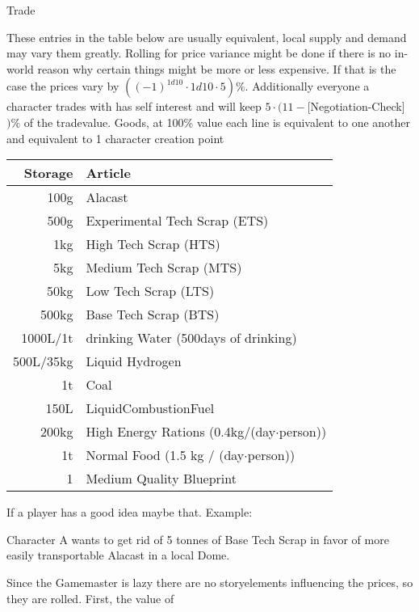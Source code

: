 \documentclass{article}
\newcommand{\subhline}[1]{\begin{center}\large #1 \normalsize \end{center}}
\begin{document}
    \pagebreak
    \subhline{Trade}

    These entries in the table below are usually equivalent, local supply and demand may vary them greatly.
    Rolling for price variance might be done if there is no in-world reason why certain things might be more or
    less expensive. If that is the case the prices vary by \(((-1)^{1d10}\cdot1d10\cdot5) \%\).
    Additionally everyone a character trades with has self interest and will keep \(5\cdot(11-\)[Negotiation-Check]\()\%\) of
    the tradevalue.\newline \newline
    Goods, at 100\% value each line is equivalent to one another and equivalent to 1 character creation point \par
    \begin{tabular}{r|l}
        Storage & Article\\\hline
        100g & Alacast\\\hline
        500g & Experimental Tech Scrap (ETS)\\\hline
        1kg & High Tech Scrap (HTS)\\\hline
        5kg & Medium Tech Scrap (MTS)\\\hline
        50kg & Low Tech Scrap (LTS)\\\hline
        500kg & Base Tech Scrap (BTS)\\\hline
        1000L/1t & drinking Water (500days of drinking)\\\hline
        500L/35kg & Liquid Hydrogen\\\hline
        1t & Coal\\\hline
        150L & LiquidCombustionFuel\\\hline
        200kg & High Energy Rations (0.4kg/(day\(\cdot\)person))\\\hline
        1t & Normal Food (1.5 kg / (day\(\cdot\)person))\\\hline
        1 & Medium Quality Blueprint\\\hline

    \end{tabular}\par
    If a player has a good idea maybe that.\newline
    \newline
    Example:\par
    Character A wants to get rid of 5 tonnes of Base Tech Scrap in favor of more easily transportable Alacast in a local
    Dome.\par
    Since the Gamemaster is lazy there are no storyelements influencing the prices, so they are rolled. First, the value of
\end{document}
